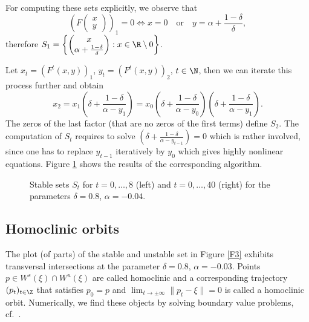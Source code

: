 For computing these sets explicitly, we observe that 
$$
\left( F
\begin{pmatrix}
x \\ y  
\end{pmatrix}
\right)_1 = 0
\Leftrightarrow
x = 0 \quad \text{or}\quad y = \alpha+\frac {1-\delta}{\delta},
$$
therefore $S_1=\left\{
  \begin{pmatrix}
  x  \\ \alpha+\frac {1-\delta}{\delta} 
  \end{pmatrix}: x \in \R\setminus 0 \right\}$.

Let $x_t = (F^t(x,y))_1$,  $y_t = (F^t(x,y))_2$, $t\in \N$, then
we can iterate this process further and obtain
$$
x_2 = x_1\left(\delta +\frac {1-\delta}{\alpha - y_1}\right) 
= x_0\left(\delta +\frac {1-\delta}{\alpha - y_0}\right)
\left(\delta +\frac {1-\delta}{\alpha - y_1}\right).
$$
The zeros of the last factor (that are no zeros of the first terms) 
define $S_2$. 
The computation of $S_t$ requires to solve  $\left(\delta +\frac
  {1-\delta}{\alpha - y_{t-1}}\right) = 0$ which is rather involved,
since one has to replace $y_{t-1}$ iteratively by $y_0$ which gives
highly nonlinear equations. Figure \ref{F2} shows the results of the
corresponding algorithm.

\begin{figure}[H]
\begin{center}
\end{center}
\caption{Stable sets $S_t$ for $t=0,\dots,8$ (left) and $t=0,\dots,40$
  (right) for the parameters $\delta = 0.8$, $\alpha = -0.04$.\label{F2}}
\end{figure}

\subsection{Homoclinic orbits}
The plot (of parts) of the stable and unstable set in Figure \ref{F3} exhibits
transversal intersections at the parameter $\delta = 0.8$,
$\alpha = -0.03$. Points $p \in
W^s(\xi)\cap W^u(\xi)$ are called homoclinic and a corresponding 
trajectory $(p_t)_{t\in \Z}$ that satisfies $p_0 = p$ and 
$\lim_{t\to \pm \infty} \|p_t - \xi\| = 0$ is called a homoclinic orbit.
Numerically, we find these objects by solving boundary value
problems, cf.\ \cite{bk97b, bhkz04}.

